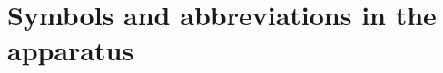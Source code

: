 \documentclass[11pt]{book}
\begin{document}

\
\pagebreak

\blankpage





















\thispagestyle{empty}

\section{Symbols and abbreviations in the apparatus}
\end{document}
